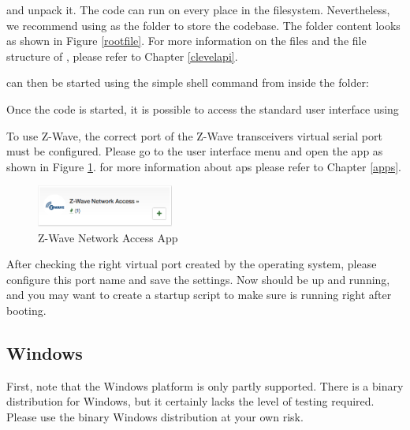 and unpack it. The code can run on every place in the filesystem. Nevertheless, we 
recommend using  as the folder to store the codebase. The 
folder content looks as shown in Figure \ref{rootfile}. For more information on the 
files and the file structure of \zway, please refer to Chapter \ref{clevelapi}.

\zway can then be started using the simple shell command from inside the \zway folder:

\begin{quote}
\end{quote}

Once the code is started, it is possible to access the standard user interface using 

To use Z-Wave, the correct port of the Z-Wave transceivers virtual serial port must be 
configured. Please  go to the user interface menu and open the app  
as shown in Figure \ref{zwaynetworkapp}. for more information about \zway aps please refer 
to Chapter \ref{apps}.

\begin{figure}
\begin{center}
\includegraphics[width=0.4\textwidth]{pngs/cap3/zwavenetwork.png}
\caption{Z-Wave Network Access App}
\label{zwaynetworkapp}
\end{center}
\end{figure}

After checking the right virtual port created by the operating system, please configure 
this port name and save the settings. Now \zway should be up and running, and you may 
want to create a startup script to make sure \zway is running right after booting.

\subsection {Windows}

First, note that the Windows platform is only partly supported. There is a binary distribution 
for Windows, but it certainly lacks the level of testing required. Please use the binary 
Windows distribution at your own risk.


